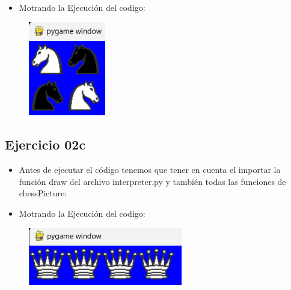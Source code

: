 \documentclass{article}
\begin{document}
		

	\begin{itemize}	
		\item Motrando la Ejecución del codigo:
	\end{itemize}	
	
	\begin{figure}[H]
		\centering
		\includegraphics[width=0.3\textwidth,keepaspectratio]{img/Ejercicio2b.png}
	\end{figure}

	\subsection{Ejercicio 02c}
	\begin{itemize}	
		\item Antes de ejecutar el código tenemos que tener en cuenta el importar la función draw del archivo interpreter.py y también todas las funciones de chessPicture:
	\end{itemize}	
	
		

	\begin{itemize}	
		\item Motrando la Ejecución del codigo:
	\end{itemize}	
	
	\begin{figure}[H]
		\centering
		\includegraphics[width=0.6\textwidth,keepaspectratio]{img/Ejercicio2c.png}
	\end{figure}
\end{document}
